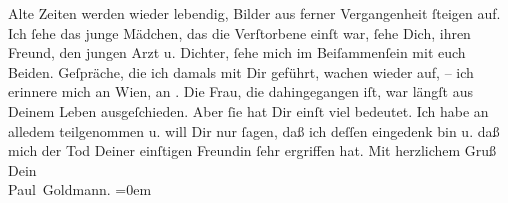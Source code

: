 \begin{ledgroupsized}[t]{13cm}
               Alte Zeiten werden wieder lebendig, Bilder aus ferner Vergangenheit ſteigen auf. Ich
               ſehe das junge Mädchen, das die Verſtorbene einſt war, ſehe Dich, ihren Freund, den jungen Arzt u. Dichter,
               ſehe mich im Beiſammenſein mit euch Beiden. Geſpräche, die ich damals mit Dir geführt, wachen
               wieder auf, – ich erinnere mich an Wien, an
                  \label{K_L03480-3v}\label{K_L03480-3h}.\pend
           \pstart
           Die Frau, die dahingegangen
               iſt, war längſt aus Deinem Leben ausgeſchieden. Aber ſie hat Dir einſt viel bedeutet.
                   Ich habe an alledem {\pb}teilgenommen u. will
               Dir nur ſagen, daß ich deſſen eingedenk bin u. daß mich der Tod Deiner einſtigen Freundin ſehr ergriffen
               hat.\pend
           \pstart
           Mit herzlichem Gruß {\\[\baselineskip]}Dein {\\[\baselineskip]}\spacefill\mbox{Paul Goldmann.}\pend
           \leftskip=0em{}
         
         \endnumbering{}\end{ledgroupsized}  \newcommand{\dateiname}{L03480}\newcommand{\titel}{Paul Goldmann an Arthur Schnitzler, 20. 11. 1925}\newcommand{\editorInnen}{Martin Anton Müller und Laura Untner}
      